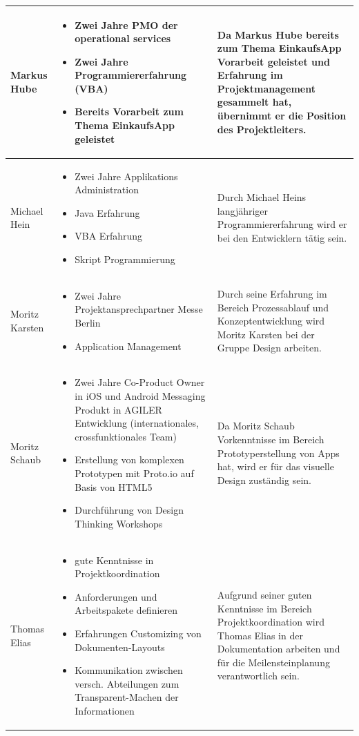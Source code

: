\documentclass[12pt,a4paper]{article}
\begin{document}
\begin{tabular}{|m{5cm}|m{5cm}|m{5cm}|}
\\
\hline
\centering Markus Hube & \begin {itemize}
\item Zwei Jahre PMO der operational services
\item Zwei Jahre Programmiererfahrung (VBA)
\item Bereits Vorarbeit zum Thema EinkaufsApp geleistet 
\end {itemize}
& Da Markus Hube bereits zum Thema EinkaufsApp Vorarbeit geleistet und Erfahrung im Projektmanagement gesammelt hat, übernimmt er die Position des Projektleiters.

\\
\hline
\centering Michael Hein & \begin {itemize}
\item Zwei Jahre Applikations Administration
\item Java Erfahrung
\item VBA Erfahrung
\item Skript Programmierung
\end {itemize}
& Durch Michael Heins langjähriger Programmiererfahrung wird er bei den Entwicklern tätig sein.

\\
\hline
\centering Moritz Karsten & \begin {itemize}
\item  Zwei Jahre Projektansprechpartner Messe Berlin
\item  Application Management
\end {itemize}
& Durch seine Erfahrung im Bereich Prozessablauf und Konzeptentwicklung wird Moritz Karsten bei der Gruppe Design arbeiten.
\\
\hline
\centering Moritz Schaub & \begin {itemize}
\item  Zwei Jahre Co-Product Owner in iOS und Android Messaging Produkt in AGILER Entwicklung (internationales, crossfunktionales Team)
\item  Erstellung von komplexen Prototypen mit Proto.io auf Basis von HTML5
\item Durchführung von Design Thinking Workshops
\end {itemize}
& Da Moritz Schaub Vorkenntnisse im Bereich Prototyperstellung von Apps hat, wird er für das visuelle Design zuständig sein.

\\
\hline
\centering Thomas Elias & \begin {itemize}
\item gute Kenntnisse in Projektkoordination
\item Anforderungen und Arbeitspakete definieren
\item Erfahrungen Customizing von Dokumenten-Layouts
\item Kommunikation zwischen versch. Abteilungen zum Transparent-Machen der Informationen
\end {itemize}
& Aufgrund seiner guten Kenntnisse im Bereich Projektkoordination wird Thomas Elias in der Dokumentation arbeiten und für die Meilensteinplanung verantwortlich sein.


\end{tabular}
\end{document}
